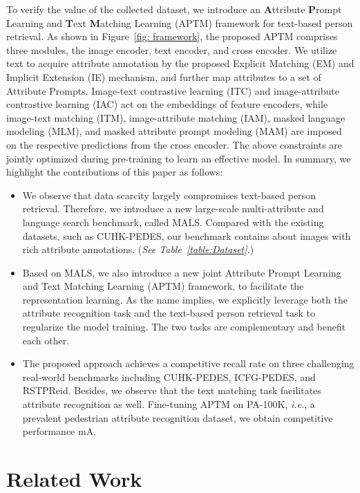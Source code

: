 \documentclass[sigconf]{acmart}
\def\ie{\emph{i.e.}}
\begin{document}
To verify the value of the collected dataset, 
we introduce an \textbf{A}ttribute \textbf{P}rompt Learning and \textbf{T}ext \textbf{M}atching Learning (APTM) framework for text-based person retrieval. 
As shown in Figure~\ref{fig: framework}, the proposed APTM comprises three modules, the image encoder, text encoder, and cross encoder. 
We utilize text to acquire attribute annotation by the proposed Explicit Matching (EM) and Implicit Extension (IE) mechanism, and further map attributes to a set of Attribute Prompts. 
Image-text contrastive learning (ITC) and image-attribute contrastive learning (IAC) act on the embeddings of feature encoders, while image-text matching (ITM), image-attribute matching (IAM), masked language modeling (MLM), and masked attribute prompt modeling (MAM) are imposed on the respective predictions from the cross encoder. 
The above constraints are jointly optimized during pre-training to learn an effective model.
In summary, we highlight the contributions of this paper as follows:
\begin{itemize}[leftmargin=*]
    \item We observe that data scarcity largely compromises text-based person retrieval. Therefore, we introduce a new large-scale multi-attribute and language search benchmark, called MALS. Compared with the existing datasets, such as CUHK-PEDES, our benchmark contains about  images with rich attribute annotations.
    (\emph{See Table~\ref{table:Dataset}.})
    
    \item Based on MALS, we also introduce a new joint Attribute Prompt Learning and Text Matching Learning (APTM) framework, to facilitate the representation learning.
    As the name implies, we explicitly leverage both the attribute recognition task and the text-based person retrieval task to regularize the model training. The two tasks are complementary and benefit each other.
    
    \item The proposed approach achieves a competitive recall rate on three challenging real-world benchmarks including CUHK-PEDES, ICFG-PEDES, and RSTPReid. 
    Besides, we observe that the text matching task facilitates attribute recognition as well.
    Fine-tuning APTM on PA-100K, \ie, a prevalent pedestrian attribute recognition dataset, we obtain competitive performance  mA. 
\end{itemize}


\section{Related Work}
\end{document}
